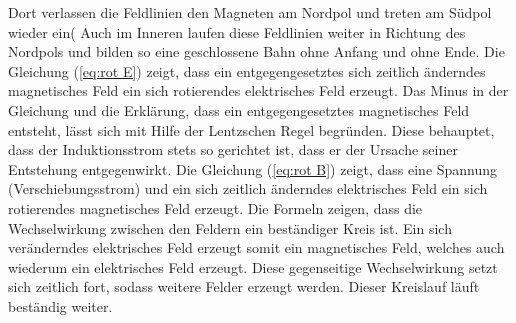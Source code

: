 Dort verlassen die Feldlinien den Magneten am Nordpol und treten am Südpol wieder ein(%
Auch im Inneren laufen diese Feldlinien weiter in Richtung des Nordpols und bilden so eine geschlossene Bahn ohne Anfang und ohne Ende.
Die Gleichung (\ref{eq:rot E}) zeigt, dass ein entgegengesetztes sich zeitlich änderndes magnetisches Feld ein sich rotierendes elektrisches Feld erzeugt.
Das Minus in der Gleichung und die Erklärung, dass ein entgegengesetztes magnetisches Feld entsteht, lässt sich mit Hilfe der Lentzschen Regel begründen.
Diese behauptet, dass der Induktionsstrom stets so gerichtet ist, dass er der Ursache seiner Entstehung entgegenwirkt.
Die Gleichung (\ref{eq:rot B}) zeigt, dass eine Spannung (Verschiebungsstrom) und ein sich zeitlich änderndes elektrisches Feld ein sich rotierendes magnetisches Feld erzeugt.
Die Formeln zeigen, dass die Wechselwirkung zwischen den Feldern ein beständiger Kreis ist. 
Ein sich veränderndes elektrisches Feld erzeugt somit ein magnetisches Feld, welches auch wiederum ein elektrisches Feld erzeugt.
Diese gegenseitige Wechselwirkung setzt sich zeitlich fort, sodass weitere Felder erzeugt werden.
Dieser Kreislauf läuft beständig weiter.